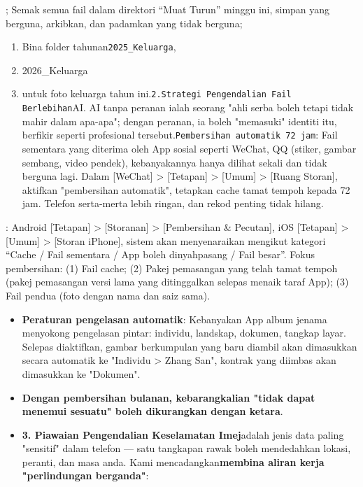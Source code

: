 \begin{tcbpractice}{;}
Semak semua fail dalam direktori “Muat Turun” minggu ini, simpan yang berguna, arkibkan, dan padamkan yang tidak berguna;

\begin{enumerate}
  \item Bina folder tahunan\texttt{2025\_Keluarga},
  \item 2026\_Keluarga
  \item untuk foto keluarga tahun ini.\texttt{2.\allowbreak  Strategi Pengendalian Fail Berlebihan}AI. AI tanpa peranan ialah seorang "ahli serba boleh tetapi tidak mahir dalam apa-apa"; dengan peranan, ia boleh "memasuki" identiti itu, berfikir seperti profesional tersebut.\texttt{Pembersihan automatik 72 jam}: Fail sementara yang diterima oleh App sosial seperti WeChat, QQ (stiker, gambar sembang, video pendek), kebanyakannya hanya dilihat sekali dan tidak berguna lagi. Dalam [WeChat] > [Tetapan] > [Umum] > [Ruang Storan], aktifkan "pembersihan automatik", tetapkan cache tamat tempoh kepada 72 jam. Telefon serta-merta lebih ringan, dan rekod penting tidak hilang.
\end{enumerate}

\end{tcbpractice}


: Android [Tetapan] > [Storanan] > [Pembersihan \& Pecutan], iOS [Tetapan] > [Umum] > [Storan iPhone], sistem akan menyenaraikan mengikut kategori “Cache / Fail sementara / App boleh dinyahpasang / Fail besar”. Fokus pembersihan: (1) Fail cache; (2) Pakej pemasangan yang telah tamat tempoh (pakej pemasangan versi lama yang ditinggalkan selepas menaik taraf App); (3) Fail pendua (foto dengan nama dan saiz sama).

\begin{itemize}
  \item \textbf{Peraturan pengelasan automatik}: Kebanyakan App album jenama menyokong pengelasan pintar: individu, landskap, dokumen, tangkap layar. Selepas diaktifkan, gambar berkumpulan yang baru diambil akan dimasukkan secara automatik ke "Individu > Zhang San", kontrak yang diimbas akan dimasukkan ke "Dokumen".
  \item \textbf{Dengan pembersihan bulanan, kebarangkalian "tidak dapat menemui sesuatu" boleh dikurangkan dengan ketara}.
  \item \textbf{3. Piawaian Pengendalian Keselamatan Imej}adalah jenis data paling "sensitif" dalam telefon — satu tangkapan rawak boleh mendedahkan lokasi, peranti, dan masa anda. Kami mencadangkan\textbf{membina aliran kerja "perlindungan berganda"}:
\end{itemize}

